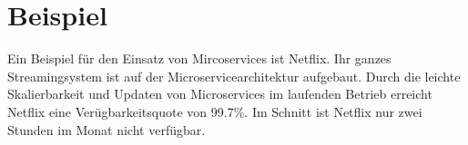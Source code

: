 \section{Beispiel}

Ein Beispiel für den Einsatz von Mircoservices ist Netflix. Ihr ganzes Streamingsystem ist auf der Microservicearchitektur aufgebaut. Durch die leichte Skalierbarkeit und Updaten von Microservices im laufenden Betrieb erreicht Netflix eine Verügbarkeitsquote von 99.7\%. Im Schnitt ist Netflix nur zwei Stunden im Monat nicht verfügbar.  
